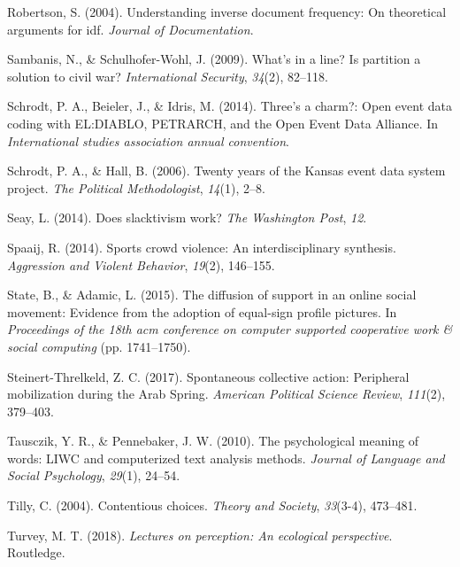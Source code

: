 \documentclass[
  english,
  man]{apa6}
\begin{document}
\leavevmode\hypertarget{ref-robertson2004understanding}{}%
Robertson, S. (2004). Understanding inverse document frequency: On theoretical arguments for idf. \emph{Journal of Documentation}.

\leavevmode\hypertarget{ref-sambanis2009s}{}%
Sambanis, N., \& Schulhofer-Wohl, J. (2009). What's in a line? Is partition a solution to civil war? \emph{International Security}, \emph{34}(2), 82--118.

\leavevmode\hypertarget{ref-schrodt2014three}{}%
Schrodt, P. A., Beieler, J., \& Idris, M. (2014). Three's a charm?: Open event data coding with EL:DIABLO, PETRARCH, and the Open Event Data Alliance. In \emph{International studies association annual convention}.

\leavevmode\hypertarget{ref-schrodt2006twenty}{}%
Schrodt, P. A., \& Hall, B. (2006). Twenty years of the Kansas event data system project. \emph{The Political Methodologist}, \emph{14}(1), 2--8.

\leavevmode\hypertarget{ref-seay2014slacktivism}{}%
Seay, L. (2014). Does slacktivism work? \emph{The Washington Post}, \emph{12}.

\leavevmode\hypertarget{ref-spaaij2014sports}{}%
Spaaij, R. (2014). Sports crowd violence: An interdisciplinary synthesis. \emph{Aggression and Violent Behavior}, \emph{19}(2), 146--155.

\leavevmode\hypertarget{ref-state2015diffusion}{}%
State, B., \& Adamic, L. (2015). The diffusion of support in an online social movement: Evidence from the adoption of equal-sign profile pictures. In \emph{Proceedings of the 18th acm conference on computer supported cooperative work \& social computing} (pp. 1741--1750).

\leavevmode\hypertarget{ref-steinert2017spontaneous}{}%
Steinert-Threlkeld, Z. C. (2017). Spontaneous collective action: Peripheral mobilization during the Arab Spring. \emph{American Political Science Review}, \emph{111}(2), 379--403.

\leavevmode\hypertarget{ref-tausczik2010psychological}{}%
Tausczik, Y. R., \& Pennebaker, J. W. (2010). The psychological meaning of words: LIWC and computerized text analysis methods. \emph{Journal of Language and Social Psychology}, \emph{29}(1), 24--54.

\leavevmode\hypertarget{ref-tilly2004contentious}{}%
Tilly, C. (2004). Contentious choices. \emph{Theory and Society}, \emph{33}(3-4), 473--481.

\leavevmode\hypertarget{ref-turvey2018lectures}{}%
Turvey, M. T. (2018). \emph{Lectures on perception: An ecological perspective}. Routledge.
\end{document}
